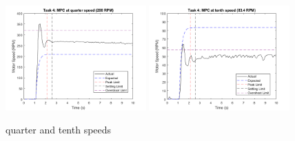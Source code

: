 \documentclass[11pt, onecolumn]{article}
\begin{document}
\begin{figure}[h!]
    \centering
    \includegraphics[width=0.48\textwidth]{q4-g3.png} \includegraphics[width=0.48\textwidth]{q4-g4.png}
    \caption{quarter and tenth speeds}
    \label{fig:q4-g2}
\end{figure}
\end{document}
